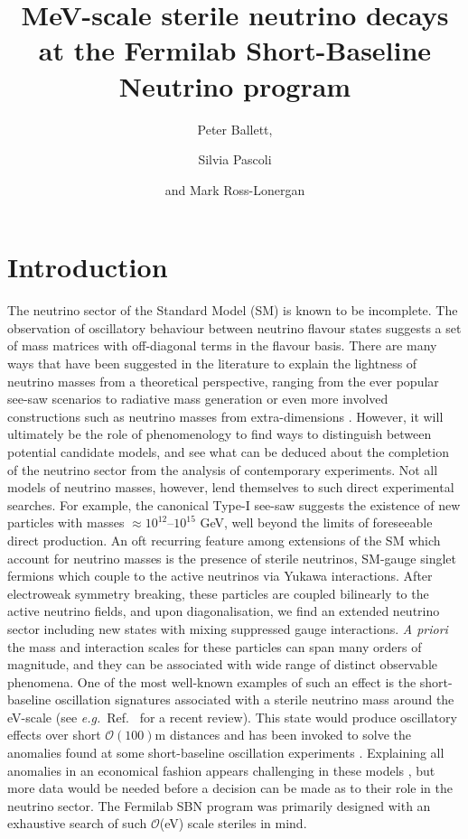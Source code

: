 \documentclass[11pt, a4paper]{article}
\title{MeV-scale sterile neutrino decays at the Fermilab Short-Baseline Neutrino program}
\author{Peter Ballett,}
\author{Silvia Pascoli}
\author{and Mark Ross-Lonergan}
\affiliation{Institute for Particle Physics Phenomenology, Department of
Physics, Durham University, South Road, Durham DH1 3LE, United Kingdom}
\newcommand{\refref}[1]{Ref.~\cite{#1}}
\def\eg{\emph{e.g.}}
\begin{document}
 

\maketitle

\section{Introduction}

The neutrino sector of the Standard Model (SM) is known to be incomplete. The
observation of oscillatory behaviour between neutrino flavour states
\cite{Fukuda:1998mi} suggests a set of mass matrices with off-diagonal terms in
the flavour basis. There are many ways that have been suggested in the
literature to explain the lightness of neutrino masses from a theoretical
perspective, ranging from the ever popular see-saw scenarios
\cite{Minkowski:1977sc, GellMann:1980vs, Mohapatra:1979ia} to radiative mass
generation \cite{Zee:1980ai,Babu:1988ki} or even more involved constructions
such as neutrino masses from extra-dimensions \cite{ArkaniHamed:1998vp}.
However, it will ultimately be the role of phenomenology to find ways to
distinguish between potential candidate models, and see what can be deduced
about the completion of the neutrino sector from the analysis of contemporary
experiments.
%
Not all models of neutrino masses, however, lend themselves to such direct
experimental searches. For example, the canonical Type-I see-saw
\cite{Minkowski:1977sc, GellMann:1980vs, Mohapatra:1979ia} suggests the
existence of new particles with masses  $\approx 10^{12}$--$10^{15}$ GeV, well
beyond the limits of foreseeable direct production. An oft recurring feature
among extensions of the SM which account for neutrino masses is the presence of
sterile neutrinos, SM-gauge singlet fermions which couple to the active
neutrinos via Yukawa interactions. After electroweak symmetry breaking, these
particles are coupled bilinearly to the active neutrino fields, and upon
diagonalisation, we find an extended neutrino sector including new states with
mixing suppressed gauge interactions. \emph{A priori} the mass and interaction
scales for these particles can span many orders of magnitude, and they can be
associated with wide range of distinct observable phenomena. 
%
One of the most well-known examples of such an effect is the short-baseline
oscillation signatures associated with a sterile neutrino mass around
the eV-scale (see \eg\ \refref{Gariazzo:2015rra} for a recent review). This
state would produce oscillatory effects over short $\mathcal{O}(100)$m
distances and has been invoked to solve the anomalies found at some
short-baseline oscillation experiments
\cite{Aguilar:2001ty,Aguilar-Arevalo:2013pmq,AguilarArevalo:2008rc}.
Explaining all anomalies in an economical fashion appears challenging in these
models \cite{Kopp:2013vaa,Conrad:2012qt}, but more data would be needed before
a decision can be made as to their role in the neutrino sector. The Fermilab
SBN \cite{Antonello:2015lea} program was primarily designed with an exhaustive
search of such $\mathcal{O}$(eV) scale steriles in mind.
\end{document}
